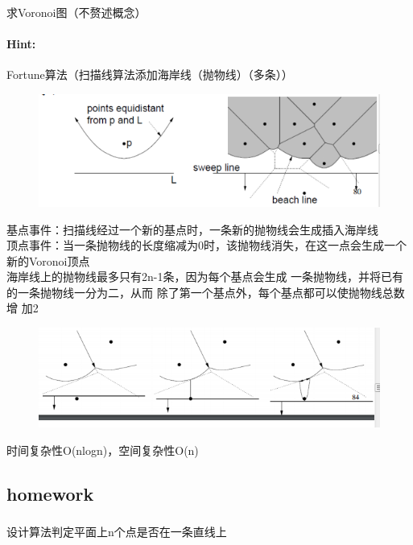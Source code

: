 \documentclass{article}
\begin{document}
      \subsubsection{}求Voronoi图（不赘述概念）
   \paragraph{Hint:}Fortune算法（扫描线算法添加海岸线（抛物线）（多条））
    \begin{figure}[h]
 	\centering
 	\includegraphics[scale=0.6]{Fortune.png}
    \end{figure}
    
    基点事件：扫描线经过一个新的基点时，一条新的抛物线会生成插入海岸线\\
顶点事件：当一条抛物线的长度缩减为0时，该抛物线消失，在这一点会生成一个新的Voronoi顶点\\
海岸线上的抛物线最多只有2n-1条，因为每个基点会生成
一条抛物线，并将已有的一条抛物线一分为二，从而
除了第一个基点外，每个基点都可以使抛物线总数增
加2
 \begin{figure}[h]
 	\centering
 	\includegraphics[scale=0.6]{jidianshijian.png}
    \end{figure}
    时间复杂性O(nlogn)，空间复杂性O(n)

    
      \subsection{homework}
     
     \subsubsection{}设计算法判定平面上n个点是否在一条直线上
\end{document}

